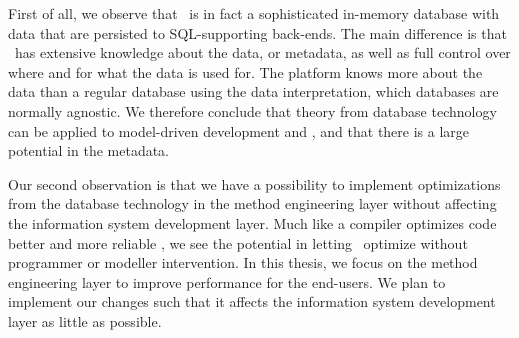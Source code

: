 First of all, we observe that \gap~is in fact a sophisticated in-memory database with data that are persisted to SQL-supporting back-ends. The main difference is that \gap~has extensive knowledge about the data, or metadata, as well as full control over where and for what the data is used for. The platform knows more about the data than a regular database using the data interpretation, which databases are normally agnostic. We therefore conclude that theory from database technology can be applied to model-driven development and \gap, and that there is a large potential in the metadata.


Our second observation is that we have a possibility to implement optimizations from the database technology in the method engineering layer without affecting the information system development layer. Much like a compiler optimizes code better and more reliable \cite{Selic2003-qa}, we see the potential in letting \gap~optimize without programmer or modeller intervention. In this thesis, we focus on the method engineering layer to improve performance for the end-users. We plan to implement our changes such that it affects the information system development layer as little as possible.

